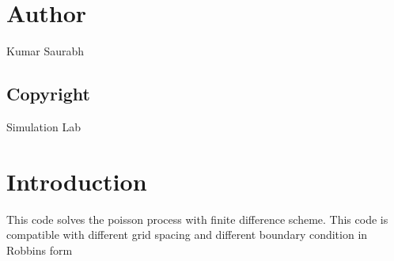 \hypertarget{index_Author}{}\section{Author}\label{index_Author}
Kumar Saurabh\hypertarget{index_Copyright}{}\subsection{Copyright}\label{index_Copyright}
Simulation Lab\hypertarget{index_Introduction}{}\section{Introduction}\label{index_Introduction}
This code solves the poisson process with finite difference scheme. This code is compatible with different grid spacing and different boundary condition in Robbins form 